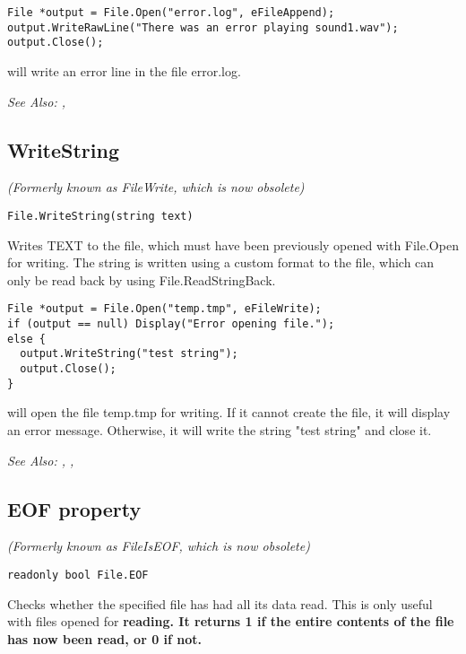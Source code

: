 \begin{verbatim}
File *output = File.Open("error.log", eFileAppend);
output.WriteRawLine("There was an error playing sound1.wav");
output.Close();
\end{verbatim}
will write an error line in the file error.log.

\it{See Also:} ,


\subsection{WriteString}\label{File.WriteString}%

\it{(Formerly known as FileWrite, which is now obsolete)}

\begin{verbatim}
File.WriteString(string text)
\end{verbatim}
Writes TEXT to the file, which must have been previously opened with
File.Open for writing. The string is written using a custom format to
the file, which can only be read back by using File.ReadStringBack.

\begin{verbatim}
File *output = File.Open("temp.tmp", eFileWrite);
if (output == null) Display("Error opening file.");
else {
  output.WriteString("test string");
  output.Close();
}
\end{verbatim}
will open the file temp.tmp for writing. If it cannot create the file, it will display
an error message. Otherwise, it will write the string "test string" and close it.

\it{See Also:} , ,


\subsection{EOF property}\label{File.EOF}%

\it{(Formerly known as FileIsEOF, which is now obsolete)}

\begin{verbatim}
readonly bool File.EOF
\end{verbatim}
Checks whether the specified file has had all its data read. This is only useful
with files opened for \bf{reading}. It returns 1 if the entire contents of the file
has now been read, or 0 if not.

